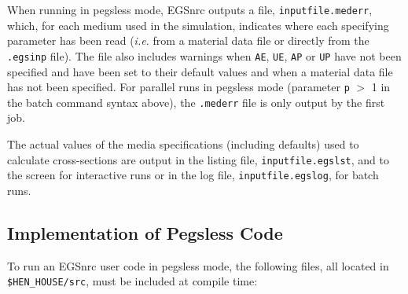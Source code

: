 When running in pegsless mode, EGSnrc outputs a file, {\tt inputfile.mederr}, which, for each medium used
in the simulation, indicates where each specifying parameter has been read ({\it i.e.} from a material data
file or directly from the {\tt .egsinp} file).  The file also includes warnings when {\tt AE}, {\tt UE},
{\tt AP} or {\tt UP} have not been specified and have been set to their default values and when a material
data file has not been specified.  For parallel runs in pegsless mode (parameter {\tt p} $>$ 1 in the batch
command syntax above), the {\tt .mederr} file is only output by the first job.

The actual values of the media specifications (including defaults) used to calculate cross-sections are
output in the listing file, {\tt inputfile.egslst}, and to the screen for interactive runs or in the
log file, {\tt inputfile.egslog}, for batch runs.

\subsection{Implementation of Pegsless Code}

To run an EGSnrc user code in pegsless mode, the following files, all located in
{\tt \$HEN\_HOUSE/src}, must be included at compile time:

